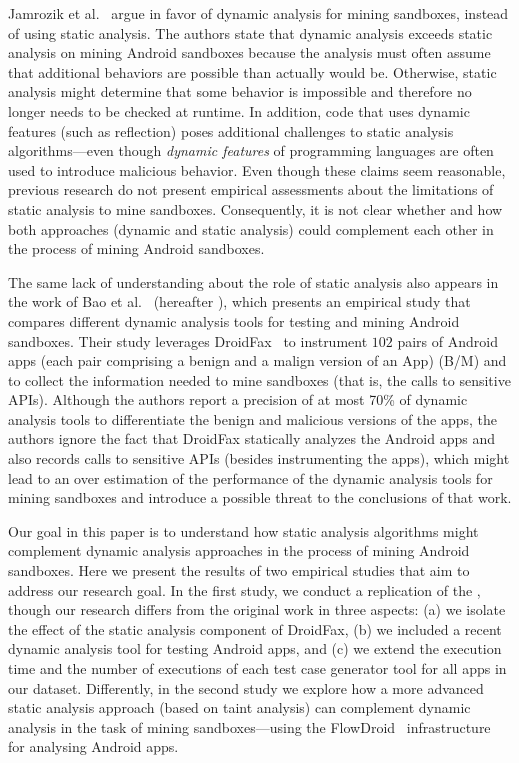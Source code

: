 Jamrozik et al.~\cite{DBLP:conf/icse/JamrozikSZ16} argue in favor of dynamic analysis for mining sandboxes, instead of using static analysis.
The authors state that dynamic analysis exceeds static analysis on mining Android sandboxes because the analysis must often
assume that additional behaviors are possible than actually would be.
Otherwise, static analysis might determine that some behavior is impossible and therefore no longer needs to be checked at runtime. In addition,
code that uses dynamic features (such as reflection) poses additional challenges to static analysis algorithms---even though \emph{dynamic features}
of programming languages are often used to introduce malicious behavior. Even though these claims
seem reasonable, previous research do not present empirical assessments about the limitations of static analysis to mine sandboxes.
Consequently, it is not clear whether and how both approaches (dynamic and static analysis) could complement each other in the process of mining Android sandboxes.

The same lack of understanding about the role of static analysis also appears in the work of Bao et al.~\cite{DBLP:conf/wcre/BaoLL18} (hereafter \blls), which presents an empirical study that compares different dynamic analysis tools for testing and mining Android sandboxes. Their study leverages DroidFax~\cite{DBLP:conf/icsm/CaiR17a} to instrument $102$ pairs of Android apps (each pair comprising a benign and a malign version of an App) (B/M) and to collect the information needed to mine sandboxes (that is, the calls to sensitive APIs).
Although the authors report a precision of at most 70\% of dynamic analysis tools to differentiate the benign and malicious versions of the apps, the authors ignore the fact that DroidFax statically analyzes the Android apps and also records calls to sensitive APIs (besides instrumenting the apps), which might lead to an over estimation of the performance of the dynamic analysis tools for mining sandboxes and introduce a possible threat to the conclusions of that work.

Our goal in this paper is to understand how static analysis
algorithms might complement dynamic analysis approaches in the process of mining Android sandboxes. Here we
present the results of two empirical studies that aim to
address our research goal. In the
first study, we conduct a replication of the \blls, though our research differs from the original work in three aspects: (a)
we isolate the effect of the static analysis component of DroidFax, (b) we included a recent dynamic analysis tool for testing Android apps,
and (c) we extend the execution time and the number of executions of each test case generator tool for all apps
in our dataset. Differently, in the second study we explore how a more advanced static analysis approach
(based on taint analysis) can complement dynamic analysis in the task of mining sandboxes---using
the FlowDroid~\cite{DBLP:conf/pldi/ArztRFBBKTOM14} infrastructure for analysing Android apps.

